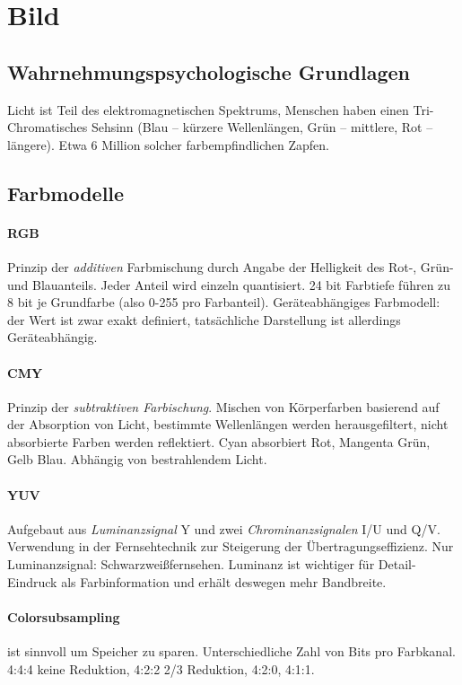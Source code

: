 \documentclass[twocolumn]{article}
\begin{document}
\section{Bild}

\subsection{Wahrnehmungspsychologische Grundlagen}

Licht ist Teil des elektromagnetischen Spektrums, Menschen haben einen Tri-Chromatisches Sehsinn (Blau -- kürzere Wellenlängen, Grün -- mittlere, Rot -- längere). Etwa 6 Million solcher farbempfindlichen Zapfen.

\subsection{Farbmodelle}

\paragraph{RGB} Prinzip der \emph{additiven} Farbmischung durch Angabe der Helligkeit des Rot-, Grün- und Blauanteils. Jeder Anteil wird einzeln quantisiert. 24 bit Farbtiefe führen zu 8 bit je Grundfarbe (also 0-255 pro Farbanteil). Geräteabhängiges Farbmodell: der Wert ist zwar exakt definiert, tatsächliche Darstellung ist allerdings Geräteabhängig.

\paragraph{CMY} Prinzip der \emph{subtraktiven Farbischung}. Mischen von Körperfarben basierend auf der Absorption von Licht, bestimmte Wellenlängen werden herausgefiltert, nicht absorbierte Farben werden reflektiert. Cyan absorbiert Rot, Mangenta Grün, Gelb Blau. Abhängig von bestrahlendem Licht.

\paragraph{YUV} Aufgebaut aus \emph{Luminanzsignal} Y und zwei \emph{Chrominanzsignalen} I/U und Q/V. Verwendung in der Fernsehtechnik zur Steigerung der Übertragungseffizienz. Nur Luminanzsignal: Schwarzweißfernsehen. Luminanz ist wichtiger für Detail-Eindruck als Farbinformation und erhält deswegen mehr Bandbreite.

\paragraph{Colorsubsampling} ist sinnvoll um Speicher zu sparen. Unterschiedliche Zahl von Bits pro Farbkanal. 4:4:4 keine Reduktion, 4:2:2 2/3 Reduktion, 4:2:0, 4:1:1.
\end{document}
